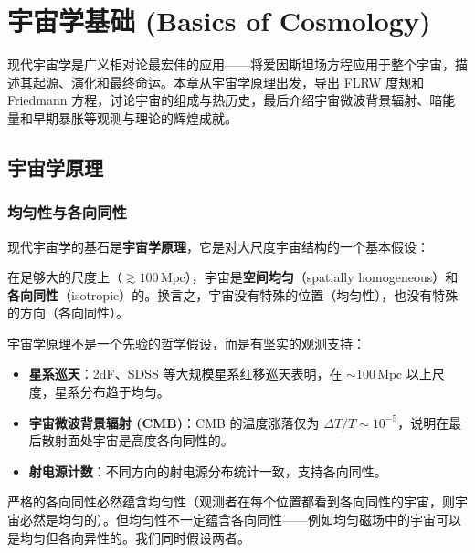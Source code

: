 \chapter{宇宙学基础 (Basics of Cosmology)}
\label{chap:cosmology}

现代宇宙学是广义相对论最宏伟的应用——将爱因斯坦场方程应用于整个宇宙，描述其起源、演化和最终命运。本章从宇宙学原理出发，导出 FLRW 度规和 Friedmann 方程，讨论宇宙的组成与热历史，最后介绍宇宙微波背景辐射、暗能量和早期暴胀等观测与理论的辉煌成就。

\section{宇宙学原理}
\label{sec:cosmological_principle}

\subsection{均匀性与各向同性}

现代宇宙学的基石是\textbf{宇宙学原理}，它是对大尺度宇宙结构的一个基本假设：

\begin{definition}
在足够大的尺度上（$\gtrsim 100\,\text{Mpc}$），宇宙是\textbf{空间均匀}（spatially homogeneous）和\textbf{各向同性}（isotropic）的。换言之，宇宙没有特殊的位置（均匀性），也没有特殊的方向（各向同性）。
\label{def:cosmological_principle}
\end{definition}

\begin{note}[观测证据]
宇宙学原理不是一个先验的哲学假设，而是有坚实的观测支持：
\begin{itemize}
    \item \textbf{星系巡天}：2dF、SDSS 等大规模星系红移巡天表明，在 $\sim 100\,\text{Mpc}$ 以上尺度，星系分布趋于均匀。
    \item \textbf{宇宙微波背景辐射 (CMB)}：CMB 的温度涨落仅为 $\Delta T / T \sim 10^{-5}$，说明在最后散射面处宇宙是高度各向同性的。
    \item \textbf{射电源计数}：不同方向的射电源分布统计一致，支持各向同性。
\end{itemize}
\end{note}

严格的各向同性必然蕴含均匀性（观测者在每个位置都看到各向同性的宇宙，则宇宙必然是均匀的）。但均匀性不一定蕴含各向同性——例如均匀磁场中的宇宙可以是均匀但各向异性的。我们同时假设两者。

